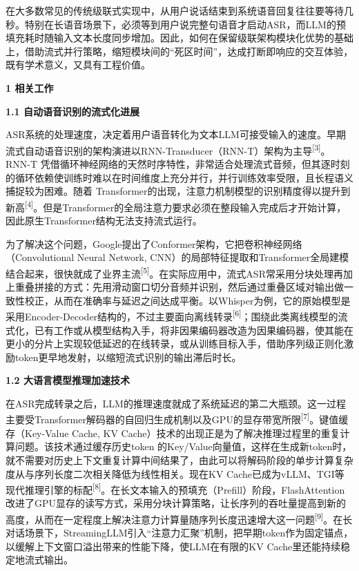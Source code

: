\documentclass[
]{article}
\begin{document}
在大多数常见的传统级联式实现中，从用户说话结束到系统语音回复往往要等待几秒。特别在长语音场景下，必须等到用户说完整句语音才启动ASR，而LLM的预填充耗时随输入文本长度同步增加。因此，如何在保留级联架构模块化优势的基础上，借助流式并行策略，缩短模块间的``死区时间''，达成打断即响应的交互体验，既有学术意义，又具有工程价值。

\textbf{1 相关工作}

\textbf{1.1 自动语音识别的流式化进展}

ASR系统的处理速度，决定着用户语音转化为文本LLM可接受输入的速度。早期流式自动语音识别的架构演进以RNN-Transducer（RNN-T）架构为主导\textsuperscript{{[}3{]}}。RNN-T 凭借循环神经网络的天然时序特性，非常适合处理流式音频，但其逐时刻的循环依赖使训练时难以在时间维度上充分并行，并行训练效率受限，且长程语义捕捉较为困难。随着 Transformer的出现，注意力机制模型的识别精度得以提升到新高\textsuperscript{{[}4{]}}。但是Transformer的全局注意力要求必须在整段输入完成后才开始计算，因此原生Transformer结构无法支持流式运行。

为了解决这个问题，Google提出了Conformer架构，它把卷积神经网络（Convolutional Neural Network, CNN）的局部特征提取和Transformer全局建模结合起来，很快就成了业界主流\textsuperscript{{[}5{]}}。在实际应用中，流式ASR常采用分块处理再加上重叠拼接的方式：先用滑动窗口切分音频并识别，然后通过重叠区域对输出做一致性校正，从而在准确率与延迟之间达成平衡。以Whisper为例，它的原始模型是采用Encoder-Decoder结构的，不过主要面向离线转录\textsuperscript{{[}6{]}}；围绕此类离线模型的流式化，已有工作或从模型结构入手，将非因果编码器改造为因果编码器，使其能在更小的分片上实现较低延迟的在线转录，或从训练目标入手，借助序列级正则化激励token更早地发射，以缩短流式识别的输出滞后时长。

\textbf{1.2 大语言模型推理加速技术}

在ASR完成转录之后，LLM的推理速度就成了系统延迟的第二大瓶颈。这一过程主要受Transformer解码器的自回归生成机制以及GPU的显存带宽所限\textsuperscript{{[}7{]}}。键值缓存（Key-Value Cache, KV Cache）技术的出现正是为了解决推理过程里的重复计算问题。该技术通过缓存历史token 的Key/Value向量值，这样在生成新token时，就不需要对历史上下文重复计算中间结果了，由此可以将解码阶段的单步计算复杂度从与序列长度二次相关降低为线性相关。现在KV Cache已成为vLLM、TGI等现代推理引擎的标配\textsuperscript{{[}8{]}}。在长文本输入的预填充（Prefill）阶段，FlashAttention改进了GPU显存的读写方式，采用分块计算策略，让长序列的吞吐量提高到新的高度，从而在一定程度上解决注意力计算量随序列长度迅速增大这一问题\textsuperscript{{[}9{]}}。在长对话场景下，StreamingLLM引入``注意力汇聚''机制，把早期token作为固定锚点，以缓解上下文窗口溢出带来的性能下降，使LLM在有限的KV Cache里还能持续稳定地流式输出。
\end{document}
